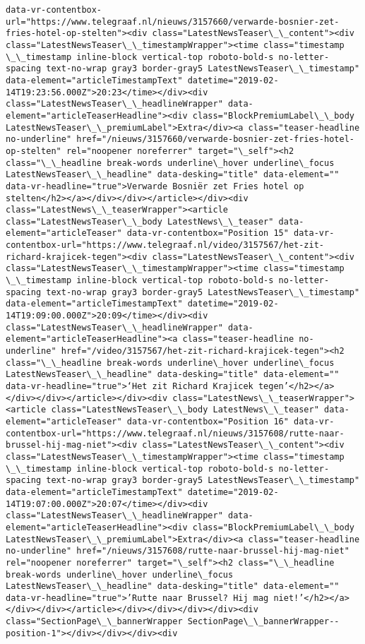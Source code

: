 \documentclass[11pt]{article}
\begin{document}
\begin{Verbatim}[commandchars=\\\{\}]
data-vr-contentbox-url="https://www.telegraaf.nl/nieuws/3157660/verwarde-bosnier-zet-fries-hotel-op-stelten"><div class="LatestNewsTeaser\_\_content"><div class="LatestNewsTeaser\_\_timestampWrapper"><time class="timestamp \_\_timestamp inline-block vertical-top roboto-bold-s no-letter-spacing text-no-wrap gray3 border-gray5 LatestNewsTeaser\_\_timestamp" data-element="articleTimestampText" datetime="2019-02-14T19:23:56.000Z">20:23</time></div><div class="LatestNewsTeaser\_\_headlineWrapper" data-element="articleTeaserHeadline"><div class="BlockPremiumLabel\_\_body LatestNewsTeaser\_\_premiumLabel">Extra</div><a class="teaser-headline no-underline" href="/nieuws/3157660/verwarde-bosnier-zet-fries-hotel-op-stelten" rel="noopener noreferrer" target="\_self"><h2 class="\_\_headline break-words underline\_hover underline\_focus LatestNewsTeaser\_\_headline" data-desking="title" data-element="" data-vr-headline="true">Verwarde Bosniër zet Fries hotel op stelten</h2></a></div></div></article></div><div class="LatestNews\_\_teaserWrapper"><article class="LatestNewsTeaser\_\_body LatestNews\_\_teaser" data-element="articleTeaser" data-vr-contentbox="Position 15" data-vr-contentbox-url="https://www.telegraaf.nl/video/3157567/het-zit-richard-krajicek-tegen"><div class="LatestNewsTeaser\_\_content"><div class="LatestNewsTeaser\_\_timestampWrapper"><time class="timestamp \_\_timestamp inline-block vertical-top roboto-bold-s no-letter-spacing text-no-wrap gray3 border-gray5 LatestNewsTeaser\_\_timestamp" data-element="articleTimestampText" datetime="2019-02-14T19:09:00.000Z">20:09</time></div><div class="LatestNewsTeaser\_\_headlineWrapper" data-element="articleTeaserHeadline"><a class="teaser-headline no-underline" href="/video/3157567/het-zit-richard-krajicek-tegen"><h2 class="\_\_headline break-words underline\_hover underline\_focus LatestNewsTeaser\_\_headline" data-desking="title" data-element="" data-vr-headline="true">‘Het zit Richard Krajicek tegen’</h2></a></div></div></article></div><div class="LatestNews\_\_teaserWrapper"><article class="LatestNewsTeaser\_\_body LatestNews\_\_teaser" data-element="articleTeaser" data-vr-contentbox="Position 16" data-vr-contentbox-url="https://www.telegraaf.nl/nieuws/3157608/rutte-naar-brussel-hij-mag-niet"><div class="LatestNewsTeaser\_\_content"><div class="LatestNewsTeaser\_\_timestampWrapper"><time class="timestamp \_\_timestamp inline-block vertical-top roboto-bold-s no-letter-spacing text-no-wrap gray3 border-gray5 LatestNewsTeaser\_\_timestamp" data-element="articleTimestampText" datetime="2019-02-14T19:07:00.000Z">20:07</time></div><div class="LatestNewsTeaser\_\_headlineWrapper" data-element="articleTeaserHeadline"><div class="BlockPremiumLabel\_\_body LatestNewsTeaser\_\_premiumLabel">Extra</div><a class="teaser-headline no-underline" href="/nieuws/3157608/rutte-naar-brussel-hij-mag-niet" rel="noopener noreferrer" target="\_self"><h2 class="\_\_headline break-words underline\_hover underline\_focus LatestNewsTeaser\_\_headline" data-desking="title" data-element="" data-vr-headline="true">’Rutte naar Brussel? Hij mag niet!’</h2></a></div></div></article></div></div></div></div><div class="SectionPage\_\_bannerWrapper SectionPage\_\_bannerWrapper--position-1"></div></div></div><div 
\end{Verbatim}
\end{document}
